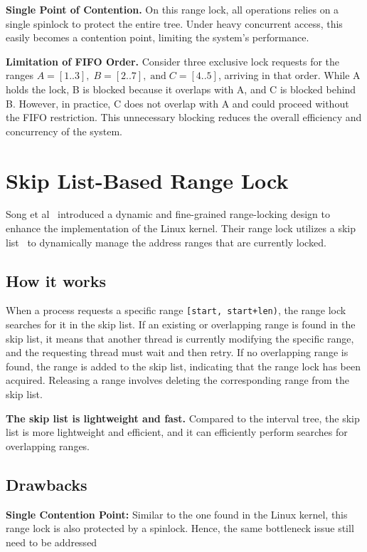\textbf{Single Point of Contention.}
On this range lock, all operations relies on a single spinlock to protect the entire tree. Under heavy concurrent access, this easily becomes a contention point, limiting the system's performance.
    
\textbf{Limitation of FIFO Order.} 
Consider three exclusive lock requests for the ranges \( A = [1..3], \; B = [2..7], \; \text{and} \; C = [4..5] \), arriving in that order. While A holds the lock, B is blocked because it overlaps with A, and C is blocked behind B. However, in practice, C does not overlap with A and could proceed without the FIFO restriction. This unnecessary blocking reduces the overall efficiency and concurrency of the system.

\section{Skip List-Based Range Lock}

Song et al~\parencite{song2013parallelizing} introduced a dynamic and fine-grained range-locking design to enhance the implementation of the Linux kernel. Their range lock utilizes a skip list~\parencite{pugh1990skip} to dynamically manage the address ranges that are currently locked.

\subsection*{How it works}

When a process requests a specific range \texttt{[start, start+len)}, the range lock searches for it in the skip list. If an existing or overlapping range is found in the skip list, it means that another thread is currently modifying the specific range, and the requesting thread must wait and then retry. If no overlapping range is found, the range is added to the skip list, indicating that the range lock has been acquired. Releasing a range involves deleting the corresponding range from the skip list.

\textbf{The skip list is lightweight and fast.} 
Compared to the interval tree, the skip list is more lightweight and efficient, and it can efficiently perform searches for overlapping ranges.

\subsection*{Drawbacks}

\textbf{Single Contention Point:} 
Similar to the one found in the Linux kernel, this range lock is also protected by a spinlock. Hence, the same bottleneck issue still need to be addressed  

